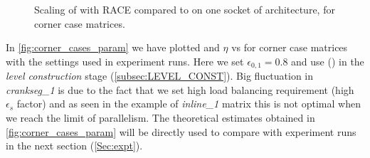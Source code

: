\begin{figure}[tbhp]
	\centering
	\caption{Scaling of \SymmSpmv with RACE compared to \SpMV on one socket of \SKX architecture, for corner case matrices.}
	\label{fig:corner_cases_scaling}
\end{figure}
 In \cref{fig:corner_cases_param} we have plotted \threadEff and $\eta$ vs \nthreads for corner case matrices with the settings used in experiment runs. Here we set $\epsilon_{0,1}=0.8$ and use \RCM (\RCMfull) in the \emph{level construction} stage (\cref{subsec:LEVEL_CONST}). Big fluctuation in \emph{crankseg\_1} is due to the fact that we set high load balancing requirement (high $\epsilon_s$ factor) and as seen in the example of \emph{inline\_1} matrix this is not optimal when we reach the limit of parallelism. The theoretical estimates obtained in \cref{fig:corner_cases_param} will be directly used to compare with experiment runs in the next section (\cref{Sec:expt}).


